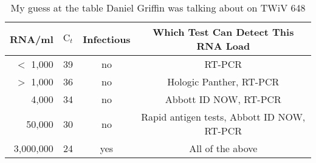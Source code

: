 \documentclass[11pt, oneside]{article}   	%
\begin{document}
\begin{table}
  \begin{center}
    \begin{tabular}{r|c|c|c} 
      \textbf{RNA/ml} & \textbf{$\text{C}_t$} & \textbf{Infectious} & \textbf{Which Test Can Detect This RNA Load} \\
      \hline 
      \hline 
      $<$ 1,000     & 39 & no    & RT-PCR                                                            \\
      $>$ 1,000     & 36 & no    & Hologic Panther, RT-PCR                                 \\
      4,000            & 34 & no    & Abbott ID NOW, RT-PCR                                  \\
      50,000          & 30 & no    & Rapid antigen tests, Abbott ID NOW, RT-PCR  \\
      3,000,000     & 24 & yes  & All of the above
    \end{tabular}
  \end{center}
 \caption{My guess at the table Daniel Griffin was talking about on TWiV 648}
\end{table}
\end{document}
